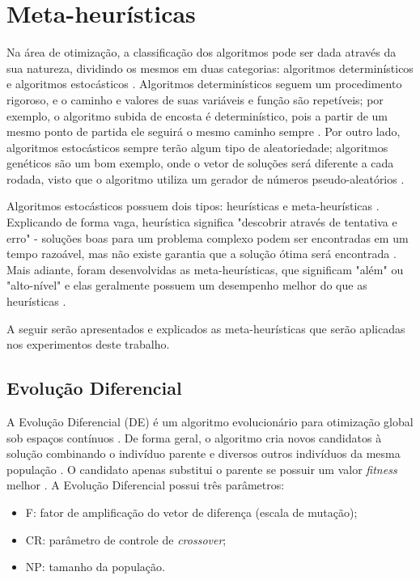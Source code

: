\section{Meta-heurísticas}

Na área de otimização, a classificação dos algoritmos pode ser dada através da sua natureza, dividindo os mesmos em duas categorias: algoritmos determinísticos e algoritmos estocásticos \cite{yang}. Algoritmos determinísticos seguem um procedimento rigoroso, e o caminho e valores de suas variáveis e função são repetíveis; por exemplo, o algoritmo subida de encosta é determinístico, pois a partir de um mesmo ponto de partida ele seguirá o mesmo caminho sempre \cite{yang}. Por outro lado, algoritmos estocásticos sempre terão algum tipo de aleatoriedade; algoritmos genéticos são um bom exemplo, onde o vetor de soluções será diferente a cada rodada, visto que o algoritmo utiliza um gerador de números pseudo-aleatórios \cite{yang}.

Algoritmos estocásticos possuem dois tipos: heurísticas e meta-heurísticas \cite{yang}. Explicando de forma vaga, heurística significa "descobrir através de tentativa e erro" - soluções boas para um problema complexo podem ser encontradas em um tempo razoável, mas não existe garantia que a solução ótima será encontrada \cite{yang}. Mais adiante, foram desenvolvidas as meta-heurísticas, que significam "além" ou "alto-nível" e elas geralmente possuem um desempenho melhor do que as heurísticas \cite{yang}.

A seguir serão apresentados e explicados as meta-heurísticas que serão aplicadas nos experimentos deste trabalho.

\subsection{Evolução Diferencial}

A Evolução Diferencial (DE) é um algoritmo evolucionário para otimização global sob espaços contínuos \cite{brest}. De forma geral, o algoritmo cria novos candidatos à solução combinando o indivíduo parente e diversos outros indivíduos da mesma população \cite{brest}. O candidato apenas substitui o parente se possuir um valor \textit{fitness} melhor \cite{brest}. A Evolução Diferencial possui três parâmetros:

\begin{itemize}
    \item F: fator de amplificação do vetor de diferença (escala de mutação);
    \item CR: parâmetro de controle de \textit{crossover};
    \item NP: tamanho da população.
\end{itemize}

